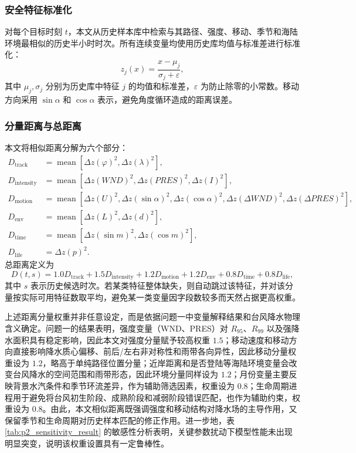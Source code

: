 \documentclass[UTF8,a4paper,zihao=5]{ctexart}
\numberwithin{equation}{section}
\numberwithin{figure}{section}
\numberwithin{table}{section}
\begin{document}
\subsubsection{安全特征标准化}

对每个目标时刻 $t$，本文从历史样本库中检索与其路径、强度、移动、季节和海陆环境最相似的历史半小时时次。所有连续变量均使用历史库均值与标准差进行标准化：
\begin{equation}
z_j(x)=\frac{x-\mu_j}{\sigma_j+\varepsilon},
\end{equation}
其中 $\mu_j,\sigma_j$ 分别为历史库中特征 $j$ 的均值和标准差，$\varepsilon$ 为防止除零的小常数。移动方向采用 $\sin \alpha$ 和 $\cos \alpha$ 表示，避免角度循环造成的距离误差。

\subsubsection{分量距离与总距离}

本文将相似距离分解为六个部分：
\begin{align}
D_{\mathrm{track}} &= \operatorname{mean}\left[
\Delta z(\varphi)^2,\Delta z(\lambda)^2
\right],\\
D_{\mathrm{intensity}} &= \operatorname{mean}\left[
\Delta z(WND)^2,\Delta z(PRES)^2,\Delta z(I)^2
\right],\\
D_{\mathrm{motion}} &= \operatorname{mean}\left[
\Delta z(U)^2,\Delta z(\sin\alpha)^2,\Delta z(\cos\alpha)^2,
\Delta z(\Delta WND)^2,\Delta z(\Delta PRES)^2
\right],\\
D_{\mathrm{env}} &= \operatorname{mean}\left[
\Delta z(L)^2,\Delta z(d)^2
\right],\\
D_{\mathrm{time}} &= \operatorname{mean}\left[
\Delta z(\sin m)^2,\Delta z(\cos m)^2
\right],\\
D_{\mathrm{life}} &= \Delta z(p)^2.
\end{align}
总距离定义为
\begin{equation}
D(t,s)=
1.0D_{\mathrm{track}}
+1.5D_{\mathrm{intensity}}
+1.2D_{\mathrm{motion}}
+1.2D_{\mathrm{env}}
+0.8D_{\mathrm{time}}
+0.8D_{\mathrm{life}},
\end{equation}
其中 $s$ 表示历史候选时次。若某类特征整体缺失，则自动跳过该特征，并对该分量按实际可用特征数取平均，避免某一类变量因字段数较多而天然占据更高权重。

上述距离分量权重并非任意设定，而是依据问题一中变量解释结果和台风降水物理含义确定。问题一的结果表明，强度变量（WND、PRES）对 $R_{95}$、$R_{99}$ 以及强降水面积具有稳定影响，因此本文对强度分量赋予较高权重 $1.5$；移动速度和移动方向直接影响降水质心偏移、前后/左右非对称性和雨带各向异性，因此移动分量权重设为 $1.2$，略高于单纯路径位置分量；近岸距离和是否登陆等海陆环境变量会改变台风降水的空间范围和雨带形态，因此环境分量同样设为 $1.2$；月份变量主要反映背景水汽条件和季节环流差异，作为辅助筛选因素，权重设为 $0.8$；生命周期进程用于避免将台风初生阶段、成熟阶段和减弱阶段错误匹配，也作为辅助约束，权重设为 $0.8$。由此，本文相似距离既强调强度和移动结构对降水场的主导作用，又保留季节和生命周期对历史样本匹配的修正作用。进一步地，表 \ref{tab:p2_sensitivity_result} 的敏感性分析表明，关键参数扰动下模型性能未出现明显突变，说明该权重设置具有一定鲁棒性。
\end{document}
